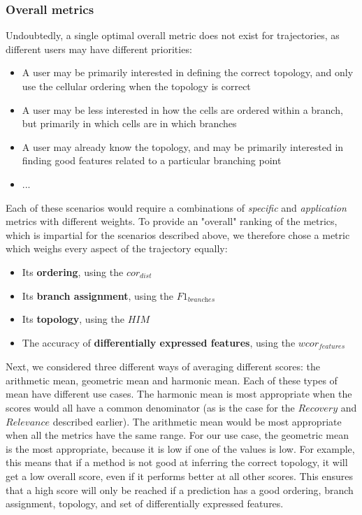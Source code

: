 \subsubsection{Overall metrics}

Undoubtedly, a single optimal overall metric does not exist for trajectories, as different users may have different priorities:

\begin{itemize}
	\item A user may be primarily interested in defining the correct topology, and only use the cellular ordering when the topology is correct
	\item A user may be less interested in how the cells are ordered within a branch, but primarily in which cells are in which branches
	\item A user may already know the topology, and may be primarily interested in finding good features related to a particular branching point
	\item ...
\end{itemize}

Each of these scenarios would require a combinations of \textit{specific} and \textit{application} metrics with different weights. To provide an "overall" ranking of the metrics, which is impartial for the scenarios described above, we therefore chose a metric which weighs every aspect of the trajectory equally:

\begin{itemize}
	\item Its \textbf{ordering}, using the $\textit{cor}_{\textit{dist}}$
	\item Its \textbf{branch assignment}, using the $\textit{F1}_{\textit{branches}}$
	\item Its \textbf{topology}, using the $\textit{HIM}$
	\item The accuracy of \textbf{differentially expressed features}, using the $\textit{wcor}_{\textit{features}}$
\end{itemize}

Next, we considered three different ways of averaging different scores: the arithmetic mean, geometric mean and harmonic mean. Each of these types of mean have different use cases. The harmonic mean is most appropriate when the scores would all have a common denominator (as is the case for the $\textit{Recovery}$ and $\textit{Relevance}$ described earlier). The arithmetic mean would be most appropriate when all the metrics have the same range. For our use case, the geometric mean is the most appropriate, because it is low if one of the values is low. For example, this means that if a method is not good at inferring the correct topology, it will get a low overall score, even if it performs better at all other scores. This ensures that a high score will only be reached if a prediction has a good ordering, branch assignment, topology, and set of differentially expressed features.


